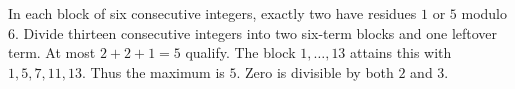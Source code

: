 In each block of six consecutive integers, exactly two have residues $1$ or $5$ modulo $6$. Divide thirteen consecutive integers into two six-term blocks and one leftover term. At most $2+2+1=5$ qualify. The block $1,\ldots,13$ attains this with $1,5,7,11,13$. Thus the maximum is $\boxed5$. Zero is divisible by both $2$ and $3$.
